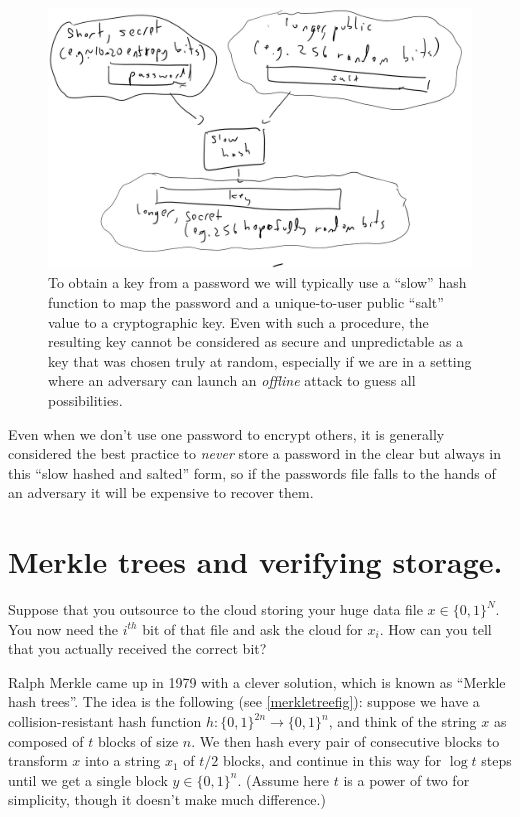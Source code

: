 \begin{figure}
\centering
\includegraphics[width=\textwidth, height=0.25\paperheight, keepaspectratio]{../figure/hash-password.jpg}
\caption{To obtain a key from a password we will typically use a
``slow'' hash function to map the password and a unique-to-user public
``salt'' value to a cryptographic key. Even with such a procedure, the
resulting key cannot be considered as secure and unpredictable as a key
that was chosen truly at random, especially if we are in a setting where
an adversary can launch an \emph{offline} attack to guess all
possibilities.}
\label{saltfig}
\end{figure}

Even when we don't use one password to encrypt others, it is generally
considered the best practice to \emph{never} store a password in the
clear but always in this ``slow hashed and salted'' form, so if the
passwords file falls to the hands of an adversary it will be expensive
to recover them.

\section{Merkle trees and verifying
storage.}\label{8-Merkle-trees-and-verif}

Suppose that you outsource to the cloud storing your huge data file
\(x\in\{0,1\}^N\). You now need the \(i^{th}\) bit of that file and ask
the cloud for \(x_i\). How can you tell that you actually received the
correct bit?

Ralph Merkle came up in 1979 with a clever solution, which is known as
``Merkle hash trees''. The idea is the following (see
\cref{merkletreefig}): suppose we have a collision-resistant hash
function \(h:\{0,1\}^{2n}\rightarrow\{0,1\}^n\), and think of the string
\(x\) as composed of \(t\) blocks of size \(n\). We then hash every pair
of consecutive blocks to transform \(x\) into a string \(x_1\) of
\(t/2\) blocks, and continue in this way for \(\log t\) steps until we
get a single block \(y\in\{0,1\}^n\). (Assume here \(t\) is a power of
two for simplicity, though it doesn't make much difference.)

